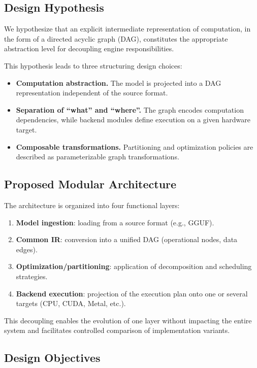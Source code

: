 \documentclass[11pt,a4paper]{article}
\begin{document}
\subsection{Design Hypothesis}

We hypothesize that an explicit intermediate representation of computation, in the form of a directed acyclic graph (DAG), constitutes the appropriate abstraction level for decoupling engine responsibilities.

This hypothesis leads to three structuring design choices:

\begin{itemize}[leftmargin=*]
	\item \textbf{Computation abstraction.} The model is projected into a DAG representation independent of the source format.
	\item \textbf{Separation of ``what'' and ``where''.} The graph encodes computation dependencies, while backend modules define execution on a given hardware target.
	\item \textbf{Composable transformations.} Partitioning and optimization policies are described as parameterizable graph transformations.
\end{itemize}

\subsection{Proposed Modular Architecture}

The architecture is organized into four functional layers:

\begin{enumerate}[leftmargin=*]
	\item \textbf{Model ingestion}: loading from a source format (e.g., GGUF).
	\item \textbf{Common IR}: conversion into a unified DAG (operational nodes, data edges).
	\item \textbf{Optimization/partitioning}: application of decomposition and scheduling strategies.
	\item \textbf{Backend execution}: projection of the execution plan onto one or several targets (CPU, CUDA, Metal, etc.).
\end{enumerate}

This decoupling enables the evolution of one layer without impacting the entire system and facilitates controlled comparison of implementation variants.

\subsection{Design Objectives}
\end{document}
